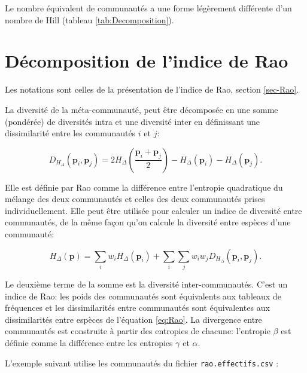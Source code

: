 \documentclass[
  11pt,
  french,
  a4paper,
  extrafontsizes,onecolumn,openright
  ]{memoir}
\begin{document}
\normalsize

Le nombre équivalent de communautés a une forme légèrement différente d'un nombre de Hill (tableau \ref{tab:Decomposition}).

\hypertarget{sec-RaoDisc}{%
\section{Décomposition de l'indice de Rao}\label{sec-RaoDisc}}

Les notations sont celles de la présentation de l'indice de Rao, section \ref{sec-Rao}.

La diversité de la méta-communauté, peut être décomposée en une somme (pondérée) de diversités intra et une diversité inter \autocite{Pavoine2004} en définissant une dissimilarité entre les communautés \(i\) et \(j\):

\begin{equation}
  \label{eq:DHdelta}
  D_{H_{\Delta }}\left(\mathbf{p}_i,\mathbf{p}_j\right)
  = 2 H_{\Delta}\left(\frac{\mathbf{p}_{i}+\mathbf{p}_j}{2}\right)
  -H_{\Delta}\left(\mathbf{p}_i\right)-H_{\Delta}\left(\mathbf{p}_j\right).
\end{equation}

Elle est définie par Rao comme la différence entre l'entropie quadratique du mélange des deux communautés et celles des deux communautés prises individuellement.
Elle peut être utilisée pour calculer un indice de diversité entre communautés, de la même façon qu'on calcule la diversité entre espèces d'une communauté:

\begin{equation}
  \label{eq:Raobeta}
  H_{\Delta }\left(\mathbf{p}\right) = \sum_i{w_i H_{\Delta }\left({\mathbf{p}}_i\right)}+\sum_i{\sum_j{w_i w_j D_{H_{\Delta }}\left({\mathbf{p}}_i,{\mathbf{p}}_j\right)}}.
\end{equation}

Le deuxième terme de la somme est la diversité inter-communautés.
C'est un indice de Rao: les poids des communautés sont équivalents aux tableaux de fréquences et les dissimilarités entre communautés sont équivalentes aux dissimilarités entre espèces de l'équation \eqref{eq:Rao}.
La divergence entre communautés est construite à partir des entropies de chacune: l'entropie \(\beta\) est définie comme la différence entre les entropies \(\gamma\) et \(\alpha\).

L'exemple suivant utilise les communautés du fichier \texttt{rao.effectifs.csv} :
\end{document}
